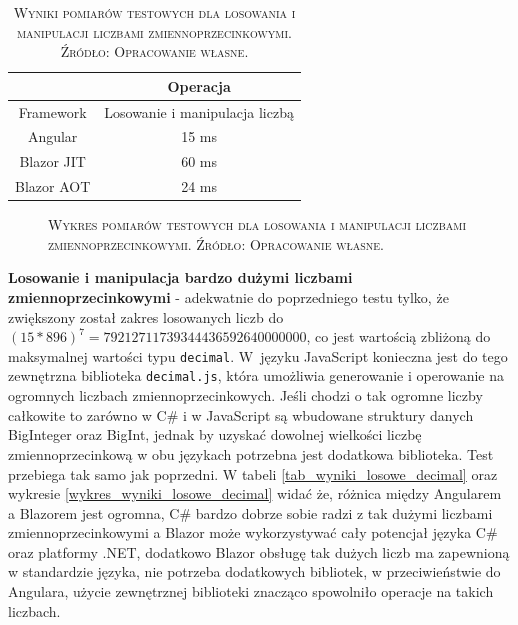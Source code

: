 \documentclass[12pt,a4paper,oneside]{book}
\newcommand{\captionT}[1]{\caption{\textsc{\footnotesize{#1}}}}
\begin{document}
\begin{table}[!htp]
\centering
\captionT{Wyniki pomiarów testowych dla losowania i manipulacji liczbami zmiennoprzecinkowymi. Źródło: Opracowanie własne.}
\begin{tabular}{ |c|c| }
 \hline
  & Operacja \\
 \hline
  Framework & Losowanie i manipulacja liczbą\\
 \hline
Angular & 15 ms\\
Blazor JIT & 60 ms\\
Blazor AOT & 24 ms\\

 \hline
\end{tabular}
\label{tab_wyniki_losowe_float}
\end{table}

\begin{figure}[!htp]
\centering
{}
\captionT{Wykres pomiarów testowych dla losowania i manipulacji liczbami zmiennoprzecinkowymi. Źródło: Opracowanie własne.}
\label{wykres_wyniki_losowe_float}
\end{figure}

\textbf{Losowanie i manipulacja bardzo dużymi liczbami zmiennoprzecinkowymi} - adekwatnie do poprzedniego testu tylko, że zwiększony został zakres losowanych liczb do $(15 * 896)^7 = 79212711739344436592640000000$, co jest wartością zbliżoną do maksymalnej wartości typu \texttt{decimal}. W~języku JavaScript konieczna jest do tego zewnętrzna biblioteka \texttt{decimal.js}, która umożliwia generowanie i operowanie na ogromnych liczbach zmiennoprzecinkowych. Jeśli chodzi o tak ogromne liczby całkowite to zarówno w C\# i w JavaScript są wbudowane struktury danych BigInteger oraz BigInt, jednak by uzyskać dowolnej wielkości liczbę zmiennoprzecinkową w obu językach potrzebna jest dodatkowa biblioteka. Test przebiega tak samo jak poprzedni.
W tabeli \ref{tab_wyniki_losowe_decimal} oraz wykresie \ref{wykres_wyniki_losowe_decimal} widać że, różnica między Angularem a Blazorem jest ogromna, C\# bardzo dobrze sobie radzi z tak dużymi liczbami zmiennoprzecinkowymi a Blazor może wykorzystywać cały potencjał języka C\# oraz platformy .NET, dodatkowo Blazor obsługę tak dużych liczb ma zapewnioną w standardzie języka, nie potrzeba dodatkowych bibliotek, w przeciwieństwie do Angulara, użycie zewnętrznej biblioteki znacząco spowolniło operacje na takich liczbach.
\end{document}
